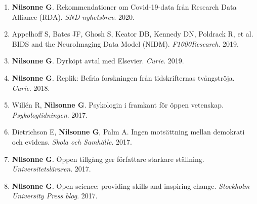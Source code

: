 \documentclass[11pt,a4paper]{article}
\begin{document}
\begin{enumerate}
\item \textbf{Nilsonne G}. Rekommendationer om Covid-19-data från Research Data Alliance (RDA). \textit{SND nyhetsbrev}. 2020.

\item Appelhoff S, Bates JF, Ghosh S, Keator DB, Kennedy DN, Poldrack R, et al. BIDS and the NeuroImaging Data Model (NIDM). \textit{F1000Research}. 2019.

\item \textbf{Nilsonne G}. Dyrköpt avtal med Elsevier. \textit{Curie}. 2019.

\item \textbf{Nilsonne G}. Replik: Befria forskningen från tidskrifternas tvångströja. \textit{Curie}. 2018.

\item Willén R, \textbf{Nilsonne G}. Psykologin i framkant för öppen vetenskap. \textit{Psykologtidningen}. 2017.

\item Dietrichson E, \textbf{Nilsonne G}, Palm A. Ingen motsättning mellan demokrati och evidens. \textit{Skola och Samhälle}. 2017.

\item \textbf{Nilsonne G}. Öppen tillgång ger författare starkare ställning. \textit{Universitetsläraren}. 2017.

\item \textbf{Nilsonne G}. Open science: providing skills and inspiring change. \textit{Stockholm University Press blog}. 2017.

\end{enumerate}
\end{document}
